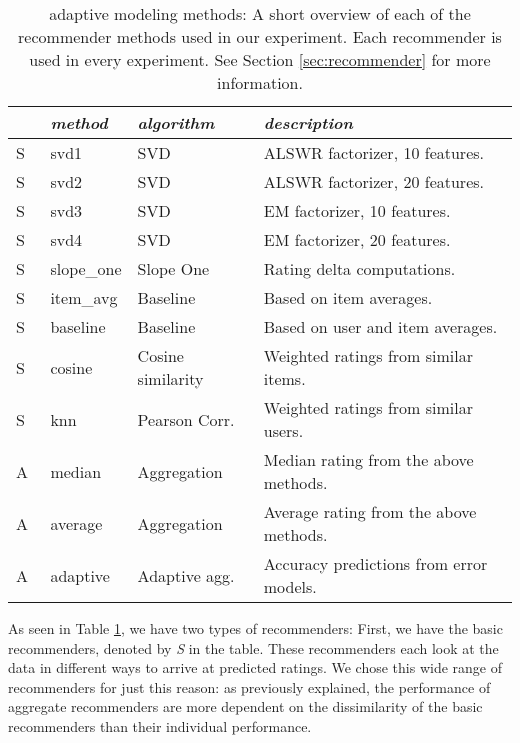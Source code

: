 \begin{table}[t]
  \begin{tabular*}{\textwidth}{ l l l l }
    \toprule
    ~ & \emph{method} &  \emph{algorithm} & \emph{description} \\
    \midrule
    S & svd1          & SVD                   & ALSWR factorizer, 10 features. \\
    S & svd2          & SVD                   & ALSWR factorizer, 20 features. \\
    S & svd3          & SVD                   & EM factorizer, 10 features. \\
    S & svd4          & SVD                   & EM factorizer, 20 features. \\
    S & slope\_one    & Slope One             & Rating delta computations. \\
    S & item\_avg     & Baseline              & Based on item averages. \\ 
    S & baseline      & Baseline              & Based on user and item averages.\\ 
    S & cosine   	    & Cosine similarity     & Weighted ratings from similar items.\\ 
    S & knn       	  & Pearson Corr.         & Weighted ratings from similar users.\\
    \midrule
    A & median    	  & Aggregation           & Median rating from the above methods. \\
    A & average    	  & Aggregation           & Average rating from the above methods. \\
    A & adaptive      & Adaptive agg.         & Accuracy predictions from error models. \\
    \bottomrule
  \end{tabular*}
  \caption[adaptive Modeling Methods]{
    adaptive modeling methods: A short overview of each of the recommender methods
    used in our experiment.
    Each recommender is used in every experiment. 
    See Section \ref{sec:recommender} for more information.
  }
  \label{table:results:methods}
\end{table}

As seen in Table \ref{table:results:methods}, we have two types of recommenders:
First, we have the basic recommenders, denoted by \emph{S} in the table.
These recommenders each look at the data in different ways to arrive at predicted ratings.
We chose this wide range of recommenders for just this reason:
as previously explained, the performance of aggregate recommenders
are more dependent on the dissimilarity of the basic recommenders
than their individual performance.

